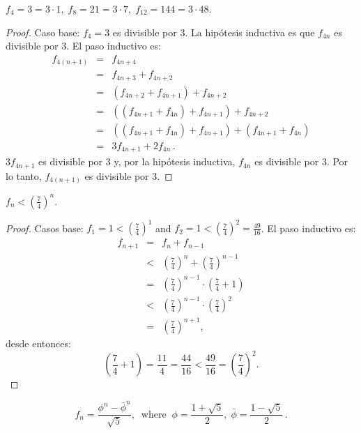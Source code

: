 \begin{example}
$f_4=3=3\cdot 1,\; f_8=21=3\cdot 7,\; f_{12}=144=3\cdot 48$.
\end{example}

\begin{proof}
Caso base: $f_4=3$ es divisible por $3$. La hipótesis inductiva es que $f_{4n}$ es divisible por $3$. El paso inductivo es:
\begin{eqnarray*}
f_{4(n+1)} &=& f_{4n+4}\\
&=& f_{4n+3}+f_{4n+2}\\
&=& (f_{4n+2}+f_{4n+1})+f_{4n+2}\\
&=& ((f_{4n+1}+f_{4n})+f_{4n+1})+f_{4n+2}\\
&=& ((f_{4n+1}+f_{4n})+f_{4n+1})+(f_{4n+1}+f_{4n})\\
&=& 3f_{4n+1}+2f_{4n}\,.
\end{eqnarray*}
$3f_{4n+1}$ es divisible por $3$ y, por la hipótesis inductiva, $f_{4n}$ es divisible por $3$. Por lo tanto, $f_{4(n+1)}$ es divisible por $3$.
\end{proof}

\begin{theorem}\label{thm.seven-fourths}
$f_n < \left(\displaystyle\frac{7}{4}\right)^n$.
\end{theorem}

\begin{proof}
Casos base: $f_1=1<\left(\displaystyle\frac{7}{4}\right)^1$ and $f_2=1<\left(\displaystyle\frac{7}{4}\right)^2=\displaystyle\frac{49}{16}$. El paso inductivo es:
\begin{eqnarray*}
f_{n+1}&=&f_n+f_{n-1}\\
&<&\left(\frac{7}{4}\right)^n + \left(\frac{7}{4}\right)^{n-1}\\
&=&\left(\frac{7}{4}\right)^{n-1}\cdot\left(\frac{7}{4}+1\right)\\
&<&\left(\frac{7}{4}\right)^{n-1}\cdot\left(\frac{7}{4}\right)^2\\
&=&\left(\frac{7}{4}\right)^{n+1},
\end{eqnarray*}
desde entonces:
\[
\left(\frac{7}{4}+1\right) = \frac{11}{4} = \frac{44}{16}<\frac{49}{16}=\left(\frac{7}{4}\right)^2.
\]
\end{proof}


\begin{theorem}

\begin{displaymath}
f_n = \frac{\phi^n - \bar{\phi}^n}{\sqrt{5}}, \;\; \mathrm{where} \;\;
\phi = \frac{1+\sqrt{5}}{2},\;\bar{\phi} = \frac{1-\sqrt{5}}{2}\,.
\end{displaymath}
\end{theorem}

